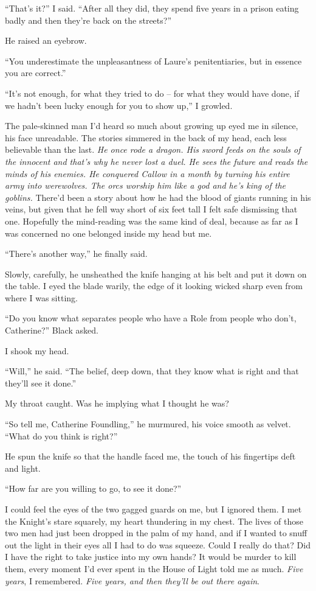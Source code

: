 \documentclass[12pt, openany]{book}
\begin{document}
“That’s it?” I said. “After all they did, they spend five years in a prison eating badly and then they’re back on the streets?”

He raised an eyebrow.

“You underestimate the unpleasantness of Laure’s penitentiaries, but in essence you are correct.”

“It’s not enough, for what they tried to do – for what they would have done, if we hadn’t been lucky enough for you to show up,” I growled.

The pale-skinned man I’d heard so much about growing up eyed me in silence, his face unreadable. The stories simmered in the back of my head, each less believable than the last. \textit{He once rode a dragon. His sword feeds on the souls of the innocent and that’s why he never lost a duel. He sees the future and reads the minds of his enemies. He conquered Callow in a month by turning his entire army into werewolves. The orcs worship him like a god and he’s king of the goblins.} There’d been a story about how he had the blood of giants running in his veins, but given that he fell way short of six feet tall I felt safe dismissing that one. Hopefully the mind-reading was the same kind of deal, because as far as I was concerned no one belonged inside my head but me.

“There’s another way,” he finally said.

Slowly, carefully, he unsheathed the knife hanging at his belt and put it down on the table. I eyed the blade warily, the edge of it looking wicked sharp even from where I was sitting.

“Do you know what separates people who have a Role from people who don’t, Catherine?” Black asked.

I shook my head.

“Will,” he said. “The belief, deep down, that they know what is right and that they’ll see it done.”

My throat caught. Was he implying what I thought he was?

“So tell me, Catherine Foundling,” he murmured, his voice smooth as velvet. “What do you think is right?”

He spun the knife so that the handle faced me, the touch of his fingertips deft and light.

“How far are you willing to go, to see it done?”

I could feel the eyes of the two gagged guards on me, but I ignored them. I met the Knight’s stare squarely, my heart thundering in my chest. The lives of those two men had just been dropped in the palm of my hand, and if I wanted to snuff out the light in their eyes all I had to do was squeeze. Could I really do that? Did I have the right to take justice into my own hands? It would be murder to kill them, every moment I’d ever spent in the House of Light told me as much. \textit{Five years}, I remembered. \textit{Five years, and then they’ll be out there again}.
\end{document}
